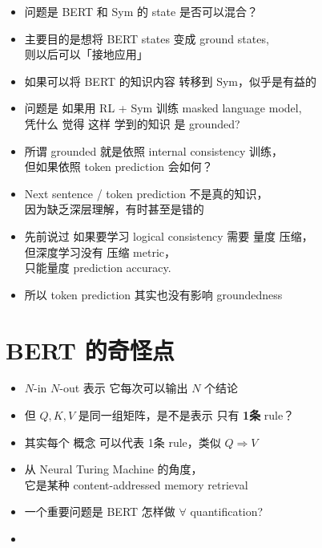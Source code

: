 \begin{itemize}
	\item 问题是 BERT 和 Sym 的 state 是否可以混合？
	\item 主要目的是想将 BERT states 变成 ground states,\\
		则以后可以「接地应用」
	\item 如果可以将 BERT 的知识内容 转移到 Sym，似乎是有益的
	\item 问题是 如果用 RL + Sym 训练 masked language model, \\
		凭什么 觉得 这样 学到的知识 是 grounded?
	\item 所谓 grounded 就是依照 internal consistency 训练，\\
		但如果依照 token prediction 会如何？
	\item Next sentence / token prediction 不是真的知识，\\
		因为缺乏深层理解，有时甚至是错的
	\item 先前说过 如果要学习 logical consistency 需要 量度 压缩，\\
		但深度学习没有 压缩 metric，\\
		只能量度 prediction accuracy.
	\item 所以 token prediction 其实也没有影响 groundedness
\end{itemize}

\section*{BERT 的奇怪点}

\begin{itemize}
	\item $N$-in $N$-out 表示 它每次可以输出 $N$ 个结论
	\item 但 $Q, K, V$ 是同一组矩阵，是不是表示 只有 \textbf{1条} rule？
	\item 其实每个 概念 可以代表 1条 rule，类似 $Q \Rightarrow V$
	\item 从 Neural Turing Machine 的角度，\\
		它是某种 content-addressed memory retrieval
	\item 一个重要问题是 BERT 怎样做 $\forall$ quantification?
	\item 
\end{itemize}



